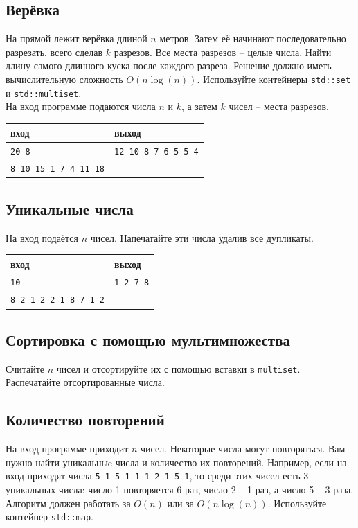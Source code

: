 \documentclass{article}
\begin{document}
\subsection{Верёвка}
На прямой лежит верёвка длиной $n$ метров. Затем её начинают последовательно разрезать, всего сделав $k$ разрезов. Все места разрезов -- целые числа. Найти длину самого длинного куска после каждого разреза. Решение должно иметь вычислительную сложность $O(n \log(n))$. Используйте контейнеры \texttt{std::set} и \texttt{std::multiset}.\\
На вход программе подаются числа $n$ и $k$, а затем $k$ чисел -- места разрезов.
\begin{center}
\begin{tabular}{ l | l }
 вход & выход \\ \hline
 \texttt{20 8} & \texttt{12 10 8 7 6 5 5 4}  \\ 
 \texttt{8 10 15 1 7 4 11 18} &  \\
\end{tabular}
\end{center}

\newpage

\subsection{Уникальные числа}
На вход подаётся $n$ чисел. Напечатайте эти числа удалив все дупликаты.
\begin{center}
\begin{tabular}{ l | l }
 вход & выход \\ \hline
 \texttt{10} & \texttt{1 2 7 8}  \\ 
 \texttt{8 2 1 2 2 1 8 7 1 2} &  \\
\end{tabular}
\end{center}

\subsection{Сортировка с помощью мультимножества}
Считайте $n$ чисел и отсортируйте их с помощью вставки в \texttt{multiset}. Распечатайте отсортированные числа.

\subsection{Количество повторений}
На вход программе приходит $n$ чисел. Некоторые числа могут повторяться. Вам нужно найти уникальныe числа и количество их повторений. Например, если на вход приходят числа \texttt{5 1 5 1 1 1 2 1 5 1}, то среди этих чисел есть 3 уникальных числа: число 1 повторяется 6 раз, число 2 -- 1 раз, а число 5 -- 3 раза. Алгоритм должен работать за $O(n)$ или за $O(n \log(n))$. Используйте контейнер \texttt{std::map}.
\end{document}
